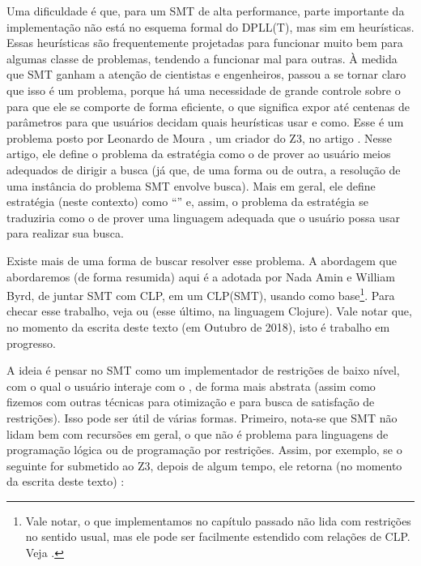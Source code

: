 \documentclass{article}
\begin{document}
Uma dificuldade é que, para um  SMT de alta
performance, parte importante da implementação não está no esquema
formal do DPLL(T), mas sim em heurísticas. Essas heurísticas
são frequentemente projetadas para funcionar muito bem para algumas
classe de problemas, tendendo a funcionar mal para outras. À
medida que  SMT ganham a atenção de cientistas e
engenheiros, passou a se tornar claro que isso é um problema, porque há
uma necessidade de grande controle sobre o  para que
ele se comporte de forma eficiente, o que 
significa expor até centenas de parâmetros para que usuários
decidam quais heurísticas usar e como. Esse é um problema posto por
Leonardo de Moura , um criador do Z3, no artigo
\cite{moura}. Nesse artigo, ele define o problema da estratégia como o
de prover ao usuário meios adequados de dirigir a busca (já que, de
uma forma ou de outra, a resolução de uma instância do problema SMT
envolve busca). Mais em geral, ele define estratégia (neste contexto)
como ``''\cite{moura} e, assim, o problema da estratégia se
traduziria como o de prover uma linguagem adequada que o usuário possa
usar para realizar sua busca.

Existe mais de uma forma de buscar resolver esse problema. A abordagem
que abordaremos (de forma resumida) aqui é a adotada por Nada Amin e
William Byrd, de juntar SMT com CLP, em um CLP(SMT), usando 
como base\footnote{Vale notar, o que implementamos no capítulo passado
  não lida com restrições no sentido usual, mas ele pode ser
  facilmente estendido com relações de CLP. Veja \cite{alvis}.}. Para
checar esse trabalho, veja \cite{namin} ou
\cite{namim} (esse último, na linguagem Clojure). Vale notar que, no
momento da escrita deste texto (em Outubro de 2018), isto é trabalho
em progresso.

A ideia é pensar no  SMT como um implementador de
restrições de baixo nível, com o qual o usuário interaje com o
, de forma mais abstrata (assim como fizemos com outras
técnicas para otimização e para busca de satisfação de
restrições). Isso pode ser útil de várias formas. Primeiro, nota-se
que  SMT não lidam bem com recursões em geral, o que
não é problema para linguagens de programação lógica ou de programação
por restrições. Assim, por exemplo, se o seguinte for submetido ao Z3,
depois de algum tempo, ele retorna (no momento da escrita deste texto)
:
\end{document}
